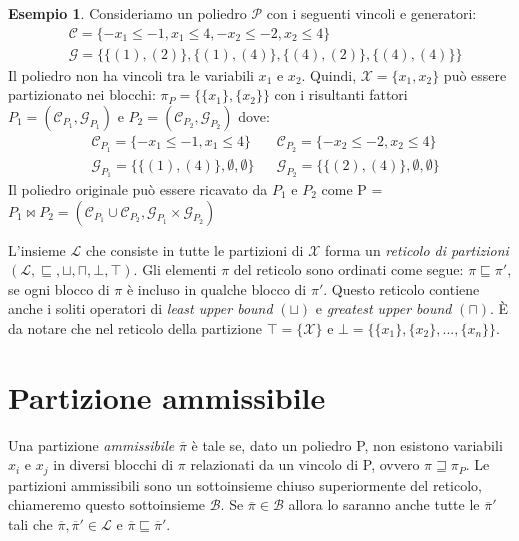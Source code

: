\documentclass{mimosis}
\theoremstyle{definition}
\newtheorem{exmp}{Esempio}[section]
\begin{document}
\begin{exmp}
  Consideriamo un poliedro $\mathcal{P}$ con i seguenti vincoli e generatori:
  \begin{align*}
    &\mathcal{C} = \{-x_{1} \le -1, x_{1} \le 4, -x_{2} \le -2, x_{2} \le 4\} \\
    &\mathcal{G} = \{\{(1),(2)\}, \{(1),(4)\}, \{(4),(2)\}, \{(4),(4)\}\}
  \end{align*}
  Il poliedro non ha vincoli tra le variabili $x_1$ e $x_2$. Quindi, $\mathcal{X} = \{x_1,x_2\}$
  può essere partizionato nei blocchi: $\pi_P = \{\{x_1\}, \{x_2\}\}$ con i risultanti fattori
  $P_1 = (\mathcal{C}_{P_1}, \mathcal{G}_{P_1})$ e $P_2 = (\mathcal{C}_{P_2}, \mathcal{G}_{P_2})$ dove:
  \begin{align*}
      &\mathcal{C}_{P_{1}} = \{-x_{1} \le -1, x_{1} \le 4\}  &&\mathcal{C}_{P_{2}} = \{ -x_{2} \le -2, x_{2} \le 4\} \\
      &\mathcal{G}_{P_{1}} = \{\{(1),(4)\}, \emptyset, \emptyset \} &&\mathcal{G}_{P_{2}} = \{\{(2),(4)\}, \emptyset, \emptyset \}
  \end{align*}
  Il poliedro originale può essere ricavato da $P_{1}$ e $P_{2}$ come
  P = $P_{1} \bowtie P_{2} = (\mathcal{C}_{P_{1}} \cup \mathcal{C}_{P_{2}}, \mathcal{G}_{P_{1}} \times \mathcal{G}_{P_{2}})$
\end{exmp}

L'insieme \(\mathcal{L}\) che consiste in tutte le partizioni di \(\mathcal{X}\)
forma un \emph{reticolo di partizioni} \((\mathcal{L}, \sqsubseteq, \sqcup, \sqcap,
\bot, \top)\). Gli elementi \(\pi\) del reticolo sono ordinati come segue: \(\pi
\sqsubseteq \pi'\), se ogni blocco di \(\pi\) è incluso in qualche blocco di
\(\pi'\). Questo reticolo contiene anche i soliti operatori di \emph{least upper bound}
\((\sqcup)\) e \emph{greatest upper bound} \((\sqcap)\). È da notare che nel reticolo della
partizione \(\top = \{\mathcal{X}\}\) e \(\bot = \{\{x_1\}, \{x_2\}, ..., \{x_n\}\}\).

\section{Partizione ammissibile}
\label{sec:orge001a19}
Una partizione \emph{ammissibile} \(\overline{\pi}\) è tale se, dato un poliedro P, non esistono
variabili \(x_i\) e \(x_j\) in diversi blocchi di \(\pi\) relazionati da un vincolo di
P, ovvero \(\pi \sqsupseteq \pi_P\). Le partizioni ammissibili sono un
sottoinsieme chiuso superiormente del reticolo, chiameremo questo sottoinsieme
\(\mathcal{B}\). Se \(\overline{\pi} \in \mathcal{B}\) allora lo saranno anche tutte
le \(\overline{\pi}'\) tali che \(\overline{\pi}, \overline{\pi}' \in \mathcal{L}\) e
\(\overline{\pi} \sqsubseteq \overline{\pi}'\).
\end{document}
